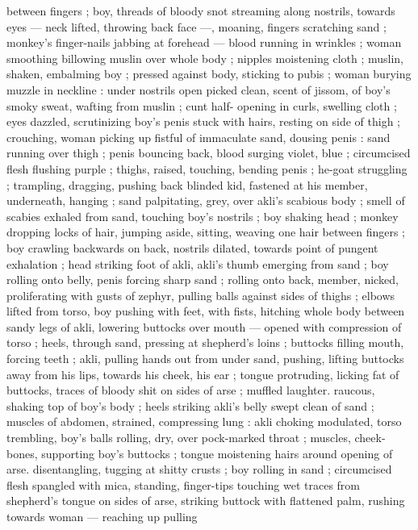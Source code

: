 between fingers ; boy, threads of bloody snot streaming along 
nostrils, towards eyes --- neck lifted, throwing back face ---, 
moaning, fingers scratching sand ; monkey's finger-nails jabbing at 
forehead --- blood running in wrinkles ; woman smoothing billowing 
muslin over whole body ; nipples moistening cloth ; muslin, shaken, 
embalming boy ; pressed against body, sticking to pubis ; woman 
burying muzzle in neckline : under nostrils open picked clean, scent 
of jissom, of boy's smoky sweat, wafting from muslin ; cunt half- 
opening in curls, swelling cloth ; eyes dazzled, scrutinizing boy's 
penis stuck with hairs, resting on side of thigh ; crouching, woman 
picking up fistful of immaculate sand, dousing penis : sand running 
over thigh ; penis bouncing back, blood surging violet, blue ; 
circumcised flesh flushing purple ; thighs, raised, touching, bending 
penis ; he-goat struggling ; trampling, dragging, pushing back 
blinded kid, fastened at his member, underneath, hanging ; sand 
palpitating, grey, over akli's scabious body ; smell of scabies exhaled 
from sand, touching boy's nostrils ; boy shaking head ; monkey 
dropping locks of hair, jumping aside, sitting, weaving one hair 
between fingers ; boy crawling backwards on back, nostrils dilated, 
towards point of pungent exhalation ; head striking foot of akli, akli's 
thumb emerging from sand ; boy rolling onto belly, penis forcing 
sharp sand ; rolling onto back, member, nicked, proliferating with 
gusts of zephyr, pulling balls against sides of thighs ; elbows lifted 
from torso, boy pushing with feet, with fists, hitching whole body 
between sandy legs of akli, lowering buttocks over mouth --- opened 
with compression of torso ; heels, through sand, pressing at 
shepherd's loins ; buttocks filling mouth, forcing teeth ; akli, pulling 
hands out from under sand, pushing, lifting buttocks away from his 
lips, towards his cheek, his ear ; tongue protruding, licking fat of 
buttocks, traces of bloody shit on sides of arse ; muffled laughter. 
raucous, shaking top of boy's body ; heels striking akli's belly swept 
clean of sand ; muscles of abdomen, strained, compressing lung : 
akli choking modulated, torso trembling, boy's balls rolling, dry, over 
pock-marked throat ; muscles, cheek-bones, supporting boy's 
buttocks ; tongue moistening hairs around opening of arse. 
disentangling, tugging at shitty crusts ; boy rolling in sand ; 
circumcised flesh spangled with mica, standing, finger-tips touching 
wet traces from shepherd's tongue on sides of arse, striking buttock 
with flattened palm, rushing towards woman --- reaching up pulling 
